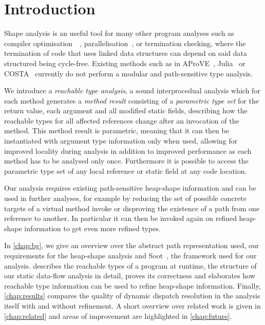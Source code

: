 \chapter{Introduction}
Shape analysis is an useful tool for many other program analyses such as compiler optimisation~~\cite{6494978}, parallelisation~\cite{sharing-analysis-arrays-collections-recursive-structures}, or termination checking, where the termination of code that uses linked data structures can depend on said data structured being cycle-free.  Existing methods such as in AProVE~\cite{automated-termination-proofs-for-java-bytecode-with-cyclic-data}, Julia~\cite{DBLP:journals/scp/ScapinS14} or COSTA~\cite{GenaimZ13} currently do not perform a modular and path-sensitive type analysis.

We introduce a \emph{reachable type analysis}, a sound interprocedual analysis which for each method generates a \emph{method result} consisting of a \emph{parametric type set} for the return value, each argument and all modified static fields, describing how the reachable types for all affected references change after an invocation of the method. This method result is parametric, meaning that it can then be instantiated with argument type information only when used, allowing for improved locality during analysis in addition to improved performance as each method has to be analysed only once. Furthermore it is possible to access the parametric type set of any local reference or static field at any code location.

Our analysis requires existing path-sensitive heap-shape information and can be used in further analyses, for example by reducing the set of possible concrete targets of a virtual method invoke or disproving the existence of a path from one reference to another. In particular it can then be invoked again on refined heap-shape information to get even more refined types.

In \cref{chap:bg}, we give an overview over the abstract path representation used, our requirements for the heap-shape analysis and Soot~\cite{vallee1999soot}, the framework used for our analysis.  describes the reachable types of a program at runtime, the structure of our static data-flow analysis in detail, proves its correctness and elaborates how reachable type information can be used to refine heap-shape information.
Finally, \cref{chap:results} compares the quality of dynamic dispatch resolution in the analysis itself with and without refinement. A short overview over related work is given in \cref{chap:related} and areas of improvement are highlighted in \cref{chap:future}.
